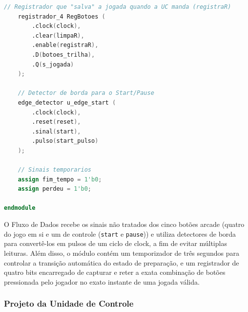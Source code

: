 \documentclass[a4paper,12pt,twoside]{article}
\begin{document}
\begin{lstlisting}[language=Verilog, caption={Fluxo de Dados}]
    // Registrador que "salva" a jogada quando a UC manda (registraR)
    registrador_4 RegBotoes (
        .clock(clock),
        .clear(limpaR),
        .enable(registraR),
        .D(botoes_trilha),
        .Q(s_jogada)
    );

    // Detector de borda para o Start/Pause
    edge_detector u_edge_start (
        .clock(clock),
        .reset(reset),
        .sinal(start),
        .pulso(start_pulso)
    );

    // Sinais temporarios
    assign fim_tempo = 1'b0;    
    assign perdeu = 1'b0; 

endmodule
\end{lstlisting}

O Fluxo de Dados recebe os sinais não tratados dos cinco botões arcade (quatro do jogo em si e um de controle (\texttt{start} e \texttt{pause})) e utiliza detectores de borda para convertê-los em pulsos de um ciclo de clock, a fim de evitar múltiplas leituras. Além disso, o módulo contém um temporizador de três segundos para controlar a transição automática do estado de preparação, e um registrador de quatro bits encarregado de capturar e reter a exata combinação de botões pressionada pelo jogador no exato instante de uma jogada válida.

\subsubsection{Projeto da Unidade de
Controle}\label{projeto-da-unidade-de-controle}
\end{document}
